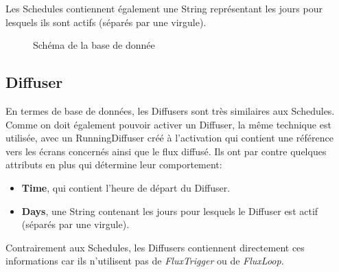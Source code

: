 \documentclass[french]{article}
\begin{document}
Les Schedules contiennent également une String représentant les jours pour lesquels ils sont actifs (séparés par une virgule). 
    
\begin{landscape}
\begin{figure}[!h]
\centering
{}
\caption{Schéma de la base de donnée}
\end{figure}
\end{landscape}
    
\newpage
\subsection{Diffuser}	

En termes de base de données, les Diffusers sont très similaires aux Schedules. Comme on doit également pouvoir activer un Diffuser, la même technique est utilisée, avec un RunningDiffuser créé à l'activation qui contient une référence vers les écrans concernés ainsi que le flux diffusé. Ils ont par contre quelques attributs en plus qui détermine leur comportement:
\begin{itemize}
	\item \textbf{Time}, qui contient l'heure de départ du Diffuser.
	\item \textbf{Days}, une String contenant les jours pour lesquels le Diffuser est actif (séparés par une virgule). \newline
\end{itemize}

Contrairement aux Schedules, les Diffusers contiennent directement ces informations car ils n'utilisent pas de \textit{FluxTrigger} ou de \textit{FluxLoop}.
\end{document}
